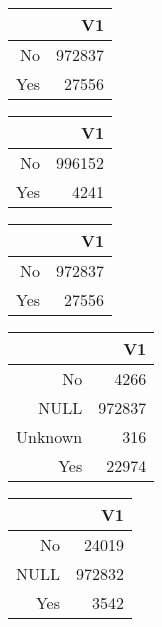 \bigskip\bigskip
\centering
\begin{tabular}{rr}
  \hline
 & V1 \\ 
  \hline
No & 972837 \\ 
  Yes & 27556 \\ 
   \hline
\end{tabular}

\bigskip\bigskip
\centering
\begin{tabular}{rr}
  \hline
 & V1 \\ 
  \hline
No & 996152 \\ 
  Yes & 4241 \\ 
   \hline
\end{tabular}

\bigskip\bigskip
\centering
\begin{tabular}{rr}
  \hline
 & V1 \\ 
  \hline
No & 972837 \\ 
  Yes & 27556 \\ 
   \hline
\end{tabular}

\bigskip\bigskip
\centering
\begin{tabular}{rr}
  \hline
 & V1 \\ 
  \hline
No & 4266 \\ 
  NULL & 972837 \\ 
  Unknown & 316 \\ 
  Yes & 22974 \\ 
   \hline
\end{tabular}

\bigskip\bigskip
\centering
\begin{tabular}{rr}
  \hline
 & V1 \\ 
  \hline
No & 24019 \\ 
  NULL & 972832 \\ 
  Yes & 3542 \\ 
   \hline
\end{tabular}

